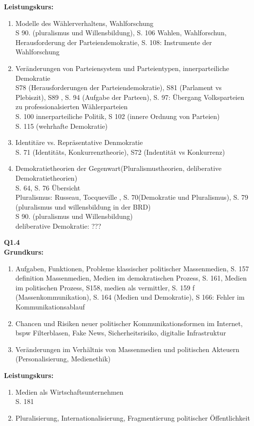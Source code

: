 \documentclass[12pt, letterpaper]{article}
\begin{document}
\textbf{Leistungskurs:} \\
\begin{enumerate}
  \item Modelle des Wählerverhaltens, Wahlforschung\\
    S 90. (pluralismus und Willensbildung), S. 106 Wahlen, Wahlforschun, Herausforderung der Parteiendemokratie,
    S. 108: Instrumente der Wahlforschung
  \item Veränderungen von Parteiensystem und Parteientypen, innerparteiliche Demokratie\\
    S78 (Herausforderungen der Parteiendemokratie), S81 (Parlament vs Plebiszit), S89 , S. 94 (Aufgabe der Parteen), S. 97: Übergang Volksparteien zu professionalsierten Wählerparteien\\
    S. 100 innerparteiliche Politik, S 102 (innere Ordnung von Parteien)\\
    S. 115 (wehrhafte Demokratie)


  \item Identitäre vs. Repräsentative Denmokratie\\
    S. 71 (Identitäts, Konkurrenztheorie), S72 (Indentität vs Konkurrenz)
  \item Demokratietheorien der Gegenwart(Pluralismustheorien, deliberative Demokratietheorien)\\
    S. 64, S. 76 Übersicht\\
    Pluralismus: Russeau, Tocqueville , S. 70(Demokratie und Pluralismus), S. 79 (pluralismus und willensbildung in der BRD)\\
    S 90. (pluralismus und Willensbildung)\\
    deliberative Demokratie: ???\\
\end{enumerate}
\textbf{Q1.4}\\ 
\textbf{Grundkurs:} 
\begin{enumerate}
  \item Aufgaben, Funktionen, Probleme klassischer politischer Massenmedien,
    S. 157 definition Massenmedien, Medien im demokratischen Prozess,
    S. 161, Medien im politischen Prozess, S158, medien als vermittler, S. 159 f (Massenkommunikation),
    S. 164 (Medien und Demokratie), S 166: Fehler im Kommunikationsablauf
  \item Chancen und Risiken neuer politischer Kommunikationsformen im Internet, bspw Filterblasen, Fake News, Sicherheitsrisiko, digitalie Infrastruktur
  \item Veränderungen  im Verhältnis von Massenmedien und politischen Akteuern (Personalisierung, Medienethik)
\end{enumerate}
\textbf{Leistungskurs:}
\begin{enumerate}
  \item Medien als Wirtschaftsunternehmen\\
    S. 181 
  \item Pluralisierung, Internationalisierung, Fragmentierung politischer Öffentlichkeit
\end{enumerate}
\newpage
\end{document}
